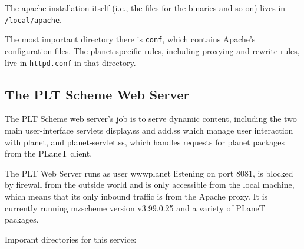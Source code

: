 \documentclass{article}
\begin{document}
The apache installation itself (i.e., the files for the binaries and
so on) lives in \texttt{/local/apache}.

The most important directory there is \texttt{conf}, which contains
Apache's configuration files. The planet-specific rules, including
proxying and rewrite rules, live in
   \texttt{httpd.conf}
in that directory.

\subsection{The PLT Scheme Web Server}

The PLT Scheme web server's job is to serve dynamic content, including
the two main user-interface servlets display.ss and add.ss which
manage user interaction with planet, and planet-servlet.ss, which
handles requests for planet packages from the PLaneT client.

The PLT Web Server runs as user wwwplanet listening on port 8081, is
blocked by firewall from the outside world and is only accessible from
the local machine, which means that its only inbound traffic is from
the Apache proxy. It is currently running mzscheme version v3.99.0.25
and a variety of PLaneT packages.

Imporant directories for this service:
\end{document}
